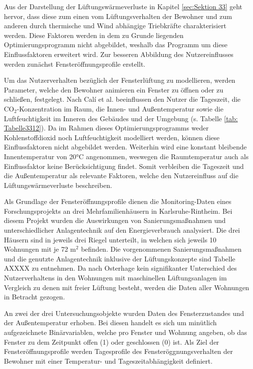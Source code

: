 Aus der Darstellung der Lüftungswärmeverluste in Kapitel \ref{sec:Sektion 33} geht hervor, dass diese zum einen vom Lüftungsverhalten der Bewohner und zum anderen durch thermische und Wind abhängige Triebkräfte charakterisiert werden.
Diese Faktoren werden in dem zu Grunde liegenden Optimierungsprogramm nicht abgebildet, weshalb das Programm um diese Einflussfaktoren erweitert wird.
Zur besseren Abbildung des Nutzereinflusses werden zunächst Fensteröffnungsprofile erstellt.

Um das Nutzerverhalten bezüglich der Fensterlüftung zu modellieren, werden Parameter, welche den Bewohner animieren ein Fenster zu öffnen oder zu schließen, festgelegt.
Nach Calí et al. beeinflussen den Nutzer die Tageszeit, die CO\(_2\)-Konzentration im Raum, die Innen- und Außentemperatur sowie die Luftfeuchtigkeit im Inneren des Gebäudes und der Umgebung (s. Tabelle \ref{tab: Tabelle3312}).
Da im Rahmen dieses Optimierungsprogramms weder Kohlenstoffdioxid noch Luftfeuchtigkeit modelliert werden, können diese Einflussfaktoren nicht abgebildet werden.
Weiterhin wird eine konstant bleibende Innentemperatur von 20°C angenommen, weswegen die Raumtemperatur auch als Einflussfaktor keine Berücksichtigung findet.
Somit verbleiben die Tageszeit und die Außentemperatur als relevante Faktoren, welche den Nutzereinfluss auf die Lüftungswärmeverluste beschreiben.

Als Grundlage der Fensteröffnungsprofile dienen die Monitoring-Daten eines Forschungsprojekts an drei Mehrfamilienhäusern in Karlsruhe-Rintheim.
Bei diesem Projekt wurden die Auswirkungen von Sanierungsmaßnahmen und unterschiedlicher Anlagentechnik auf den Energieverbrauch analysiert.
Die drei Häusern sind in jeweils drei Riegel unterteilt, in welchen sich jeweils 10 Wohnungen mit je 72 m\(^2\) befinden.
Die vorgenommenen Sanierungsmaßnahmen und die genutzte Anlagentechnik inklusive der Lüftungskonzepte sind Tabelle AXXXX zu entnehmen.
Da nach Osterhage \cite{Osterhage.2018} kein signifikanter Unterschied des Nutzerverhaltens in den Wohnungen mit maschinellen Lüftungsanlagen im Vergleich zu denen mit freier Lüftung besteht, werden die Daten aller Wohnungen in Betracht gezogen.

An zwei der drei Untersuchungsobjekte wurden Daten des Fensterzustandes und der Außentemperatur erhoben.
Bei diesen handelt es sich um minütlich aufgezeichnete Binärvariablen, welche pro Fenster und Wohnung angeben, ob das Fenster zu dem Zeitpunkt offen (1) oder geschlossen (0) ist.
Als Ziel der Fensteröffnungsprofile werden Tagesprofile des Fensteröggnungsverhalten der Bewohner mit einer Temperatur- und Tageszeitabhängigkeit definiert.

